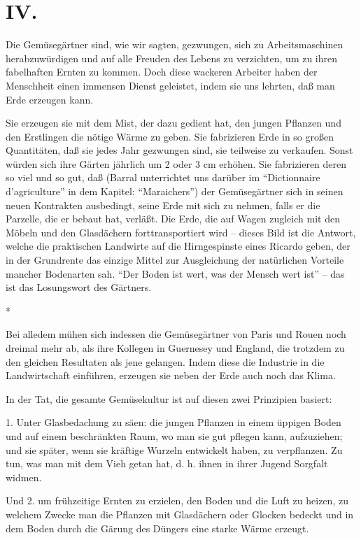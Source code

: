 \documentclass{scrbook}
\begin{document}
\section*{IV.}

Die Gemüsegärtner sind, wie wir sagten, gezwungen, sich zu Arbeitsmaschinen herabzuwürdigen und auf alle Freuden des Lebens zu verzichten, um zu ihren fabelhaften Ernten zu kommen. Doch diese wackeren Arbeiter haben der Menschheit einen immensen Dienst geleistet, indem sie uns lehrten, daß man Erde erzeugen kann.

Sie erzeugen sie mit dem Mist, der dazu gedient hat, den jungen Pflanzen und den Erstlingen die nötige Wärme zu geben. Sie fabrizieren Erde in so großen Quantitäten, daß sie jedes Jahr gezwungen sind, sie teilweise zu verkaufen. Sonst würden sich ihre Gärten jährlich um 2 oder 3 cm erhöhen. Sie fabrizieren deren so viel und so gut, daß (Barral unterrichtet uns darüber im ``Dictionnaire d’agriculture'' in dem Kapitel: ``Maraichers'') der Gemüsegärtner sich in seinen neuen Kontrakten ausbedingt, seine Erde mit sich zu nehmen, falls er die Parzelle, die er bebaut hat, verläßt. Die Erde, die auf Wagen zugleich mit den Möbeln und den Glasdächern forttransportiert wird – dieses Bild ist die Antwort, welche die praktischen Landwirte auf die Hirngespinste eines Ricardo geben, der in der Grundrente das einzige Mittel zur Ausgleichung der natürlichen Vorteile mancher Bodenarten sah. ``Der Boden ist wert, was der Mensch wert ist'' – das ist das Losungswort des Gärtners.

\begin{center}*\end{center}

Bei alledem mühen sich indessen die Gemüsegärtner von Paris und Rouen noch dreimal mehr ab, als ihre Kollegen in Guernesey und England, die trotzdem zu den gleichen Resultaten als jene gelangen. Indem diese die Industrie in die Landwirtschaft einführen, erzeugen sie neben der Erde auch noch das Klima.

In der Tat, die gesamte Gemüsekultur ist auf diesen zwei Prinzipien basiert:

1. Unter Glasbedachung zu säen: die jungen Pflanzen in einem üppigen Boden und auf einem beschränkten Raum, wo man sie gut pflegen kann, aufzuziehen; und sie später, wenn sie kräftige Wurzeln entwickelt haben, zu verpflanzen. Zu tun, was man mit dem Vieh getan hat, d. h. ihnen in ihrer Jugend Sorgfalt widmen.

Und 2. um frühzeitige Ernten zu erzielen, den Boden und die Luft zu heizen, zu welchem Zwecke man die Pflanzen mit Glasdächern oder Glocken bedeckt und in dem Boden durch die Gärung des Düngers eine starke Wärme erzeugt.
\end{document}
